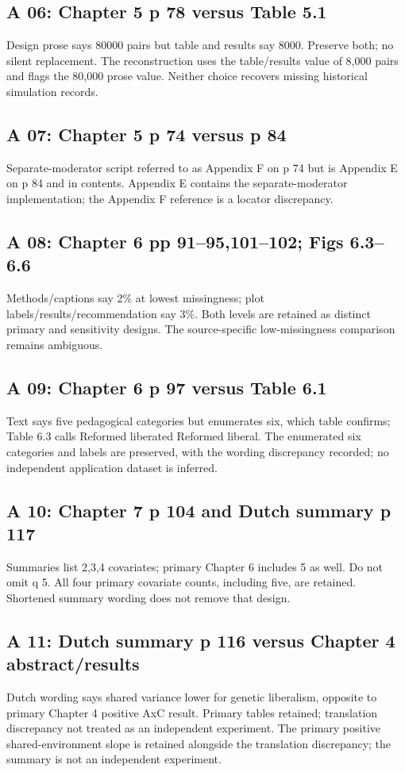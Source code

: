 \documentclass[11pt]{article}
\begin{document}
\subsection{A 06: Chapter 5 p 78 versus Table 5.1}
Design prose says 80000 pairs but table and results say 8000. Preserve both; no silent replacement. The reconstruction uses the table/results value of 8,000 pairs and flags the 80,000 prose value. Neither choice recovers missing historical simulation records.
\subsection{A 07: Chapter 5 p 74 versus p 84}
Separate-moderator script referred to as Appendix F on p 74 but is Appendix E on p 84 and in contents. Appendix E contains the separate-moderator implementation; the Appendix F reference is a locator discrepancy.
\subsection{A 08: Chapter 6 pp 91--95,101--102; Figs 6.3--6.6}
Methods/captions say 2\% at lowest missingness; plot labels/results/recommendation say 3\%. Both levels are retained as distinct primary and sensitivity designs. The source-specific low-missingness comparison remains ambiguous.
\subsection{A 09: Chapter 6 p 97 versus Table 6.1}
Text says five pedagogical categories but enumerates six, which table confirms; Table 6.3 calls Reformed liberated Reformed liberal. The enumerated six categories and labels are preserved, with the wording discrepancy recorded; no independent application dataset is inferred.
\subsection{A 10: Chapter 7 p 104 and Dutch summary p 117}
Summaries list 2,3,4 covariates; primary Chapter 6 includes 5 as well. Do not omit q 5. All four primary covariate counts, including five, are retained. Shortened summary wording does not remove that design.
\subsection{A 11: Dutch summary p 116 versus Chapter 4 abstract/results}
Dutch wording says shared variance lower for genetic liberalism, opposite to primary Chapter 4 positive AxC result. Primary tables retained; translation discrepancy not treated as an independent experiment. The primary positive shared-environment slope is retained alongside the translation discrepancy; the summary is not an independent experiment.
\end{document}
